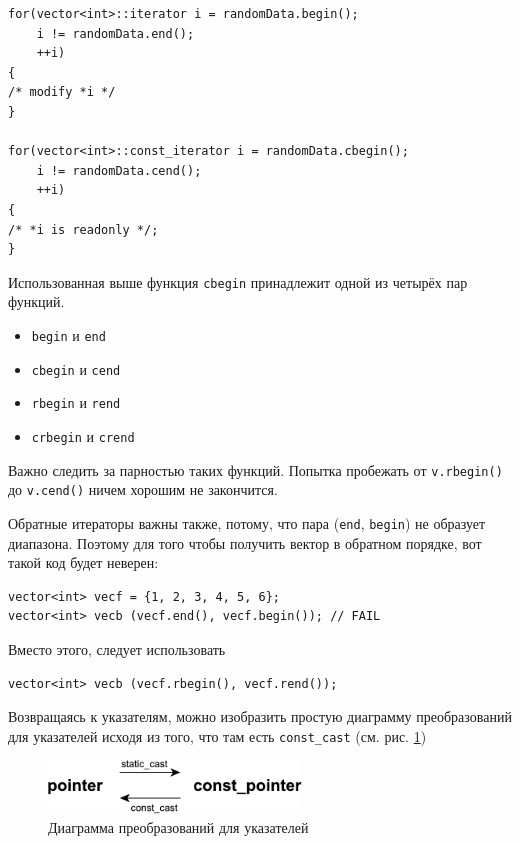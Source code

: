 \documentclass[a4paper,12pt,oneside]{book}
\begin{document}
\begin{lstlisting}
for(vector<int>::iterator i = randomData.begin(); 
    i != randomData.end(); 
    ++i) 
{
/* modify *i */
}

for(vector<int>::const_iterator i = randomData.cbegin(); 
    i != randomData.cend(); 
    ++i) 
{
/* *i is readonly */;
}
\end{lstlisting}

Использованная выше функция \lstinline!cbegin! принадлежит одной из четырёх пар функций.

\begin{itemize}
\item \lstinline!begin! и \lstinline!end!
\item \lstinline!cbegin! и \lstinline!cend!
\item \lstinline!rbegin! и \lstinline!rend!
\item \lstinline!crbegin! и \lstinline!crend!
\end{itemize}

Важно следить за парностью таких функций. Попытка пробежать от \lstinline!v.rbegin()! до \lstinline!v.cend()! ничем хорошим не закончится.

Обратные итераторы важны также, потому, что пара (\lstinline!end!, \lstinline!begin!) не образует диапазона. Поэтому для того чтобы получить вектор в обратном порядке, вот такой код будет неверен:

\begin{lstlisting}
vector<int> vecf = {1, 2, 3, 4, 5, 6};
vector<int> vecb (vecf.end(), vecf.begin()); // FAIL
\end{lstlisting}

Вместо этого, следует использовать

\begin{lstlisting}
vector<int> vecb (vecf.rbegin(), vecf.rend());
\end{lstlisting}

Возвращаясь к указателям, можно изобразить простую диаграмму преобразований для указателей исходя из того, что там есть \lstinline!const_cast! (см. рис. \ref{fig:pt_cpt})

\begin{figure}[ht]
\centering
\includegraphics[width=0.6\textwidth]{illustrations/ptcptdiag-crop.pdf}
\caption{Диаграмма преобразований для указателей}
\label{fig:pt_cpt}
\end{figure}
\end{document}
